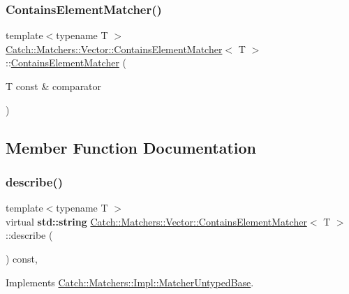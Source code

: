 \subsubsection{\texorpdfstring{Contains\+Element\+Matcher()}{ContainsElementMatcher()}}
{\footnotesize\ttfamily template$<$typename T $>$ \\
\hyperlink{struct_catch_1_1_matchers_1_1_vector_1_1_contains_element_matcher}{Catch\+::\+Matchers\+::\+Vector\+::\+Contains\+Element\+Matcher}$<$ T $>$\+::\hyperlink{struct_catch_1_1_matchers_1_1_vector_1_1_contains_element_matcher}{Contains\+Element\+Matcher} (\begin{DoxyParamCaption}\item[{T const \&}]{comparator }\end{DoxyParamCaption})\hspace{0.3cm}{\ttfamily [inline]}}



\subsection{Member Function Documentation}
\mbox{\label{struct_catch_1_1_matchers_1_1_vector_1_1_contains_element_matcher_a5a869772714dd045816707b74b217664}} 
\subsubsection{\texorpdfstring{describe()}{describe()}}
{\footnotesize\ttfamily template$<$typename T $>$ \\
virtual \textbf{ std\+::string} \hyperlink{struct_catch_1_1_matchers_1_1_vector_1_1_contains_element_matcher}{Catch\+::\+Matchers\+::\+Vector\+::\+Contains\+Element\+Matcher}$<$ T $>$\+::describe (\begin{DoxyParamCaption}{ }\end{DoxyParamCaption}) const\hspace{0.3cm}{\ttfamily [inline]}, {\ttfamily [virtual]}}



Implements \hyperlink{class_catch_1_1_matchers_1_1_impl_1_1_matcher_untyped_base_a91d3a907dbfcbb596077df24f6e11fe2}{Catch\+::\+Matchers\+::\+Impl\+::\+Matcher\+Untyped\+Base}.

